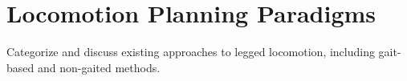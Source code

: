 \section{Locomotion Planning Paradigms}

\begin{outline}
  Categorize and discuss existing approaches to legged locomotion, including gait-based and non-gaited methods.
\end{outline}
